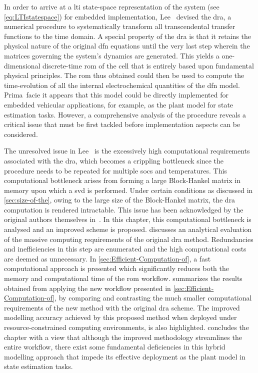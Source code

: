 In order to arrive at a  \gls{lti} state-space representation of the system (see
\cref{eq:LTIstatespace})  for embedded  implementation, Lee~\etal{}  devised the
\gls{dra}, a numerical procedure  to systematically transform all transcendental
transfer functions  to the time domain.  A special property of  the \gls{dra} is
that it  retains the physical nature  of the original \gls{dfn}  equations until
the very  last step  wherein the  matrices governing  the system's  dynamics are
generated. This  yields a  one-dimensional discrete-time  \gls{rom} of  the cell
that is entirely based upon  fundamental physical principles. The \gls{rom} thus
obtained could  then be used to  compute the time-evolution of  all the internal
electrochemical quantities of  the \gls{dfn} model. Prima~facie  it appears that
this model  could be directly  implemented for embedded  vehicular applications,
for  example,  as  the  plant  model for  state  estimation  tasks.  However,  a
comprehensive analysis  of the procedure reveals  a critical issue that  must be
first tackled before implementation aspects can be considered.

The  unresolved  issue in  Lee~\etal{}  is  the excessively  high  computational
requirements associated with the \gls{dra}, which becomes a crippling bottleneck
since  the  procedure  needs  to   be  repeated  for  multiple  \glspl{soc}  and
temperatures.  This  computational  bottleneck   arises  from  forming  a  large
Block-Hankel  matrix  in memory  upon  which  a  \gls{svd} is  performed.  Under
certain conditions  as discussed in  \cref{sec:size-of-the}, owing to  the large
size  of  the  Block-Hankel  matrix,   the  \gls{dra}  computation  is  rendered
intractable. This issue has been acknowledged by the original authors themselves
in~\cite{Lee2012,Plett2015}.  In  this  chapter, this  computational  bottleneck
is  analysed  and an  improved  scheme  is proposed.  
discusses an analytical evaluation of  the massive computing requirements of the
original  \gls{dra} method.  Redundancies and  inefficiencies in  this step  are
enumerated  and the  high  computational  costs are  deemed  as unnecessary.  In
\cref{sec:Efficient-Computation-of}, a fast  computational approach is presented
which  significantly reduces  both  the  memory and  computational  time of  the
\gls{rom}  workflow.   summarizes  the  results obtained  from
applying the  new workflow presented in  \cref{sec:Efficient-Computation-of}, by
comparing and contrasting the much smaller computational requirements of the new
method  with the  original  \gls{dra} scheme.  The  improved modelling  accuracy
achieved  by  this  proposed  method when  deployed  under  resource-constrained
computing environments, is also highlighted.  concludes the
chapter  with a  view that  although  the improved  methodology streamlines  the
entire  workflow,  there exist  some  fundamental  deficiencies in  this  hybrid
modelling approach  that impede its effective  deployment as the plant  model in
state estimation tasks.

